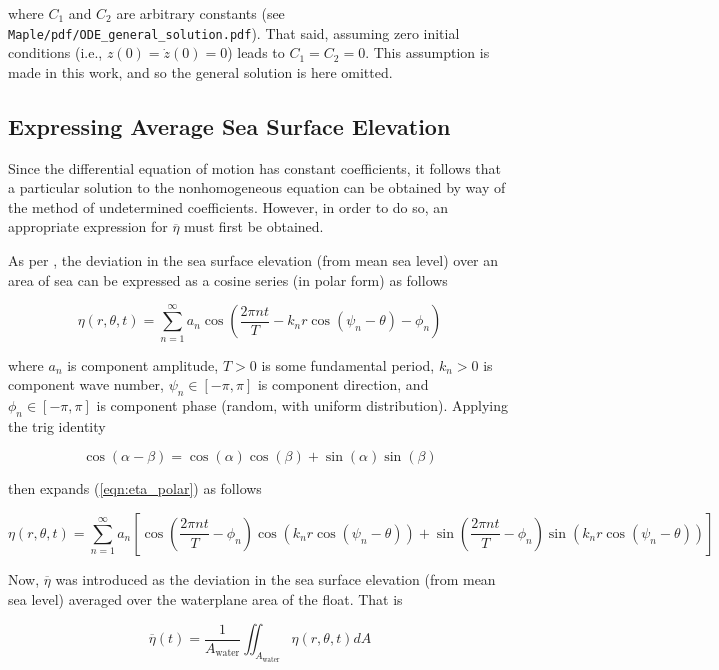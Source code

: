 \noindent where $C_1$ and $C_2$ are arbitrary constants (see \texttt{Maple/pdf/ODE\_general\_solution.pdf}). That said, assuming zero initial conditions (i.e., $z(0) = \dot{z}(0) = 0$) leads to $C_1 = C_2 = 0$. This assumption is made in this work, and so the general solution is here omitted.

\subsection{Expressing Average Sea Surface Elevation}

Since the differential equation of motion has constant coefficients, it follows that a particular solution to the nonhomogeneous equation can be obtained by way of the method of undetermined coefficients. However, in order to do so, an appropriate expression for $\overline{\eta}$ must first be obtained.\par
As per \cite{Holthuijsen_2010}, the deviation in the sea surface elevation (from mean sea level) over an area of sea can be expressed as a cosine series (in polar form) as follows

\begin{equation}
	\eta(r,\theta,t) = \sum_{n=1}^\infty a_n\cos\left(\frac{2\pi nt}{T} - k_nr\cos(\psi_n - \theta) - \phi_n\right)
	\label{eqn:eta_polar}
\end{equation}

\noindent where $a_n$ is component amplitude, $T>0$ is some fundamental period, $k_n>0$ is component wave number, $\psi_n\in[-\pi,\pi]$ is component direction, and $\phi_n\in[-\pi,\pi]$ is component phase (random, with uniform distribution). Applying the trig identity

$$ \cos(\alpha - \beta) = \cos(\alpha)\cos(\beta) + \sin(\alpha)\sin(\beta) $$

\noindent then expands (\ref{eqn:eta_polar}) as follows

\begin{equation}
	\eta(r,\theta,t) = \sum_{n=1}^\infty a_n\left[\cos\left(\frac{2\pi nt}{T} - \phi_n\right)\cos(k_nr\cos(\psi_n - \theta)) + \sin\left(\frac{2\pi nt}{T} - \phi_n\right)\sin(k_nr\cos(\psi_n - \theta))\right]
	\label{eqn:eta_polar_expanded}
\end{equation}

Now, $\overline{\eta}$ was introduced as the deviation in the sea surface elevation (from mean sea level) averaged over the waterplane area of the float. That is

\begin{equation}
	\overline{\eta}(t) = \frac{1}{A_\textrm{water}}\iint_{A_\textrm{water}}\eta(r,\theta,t)dA
	\label{eqn:eta_overline_integral}
\end{equation}

